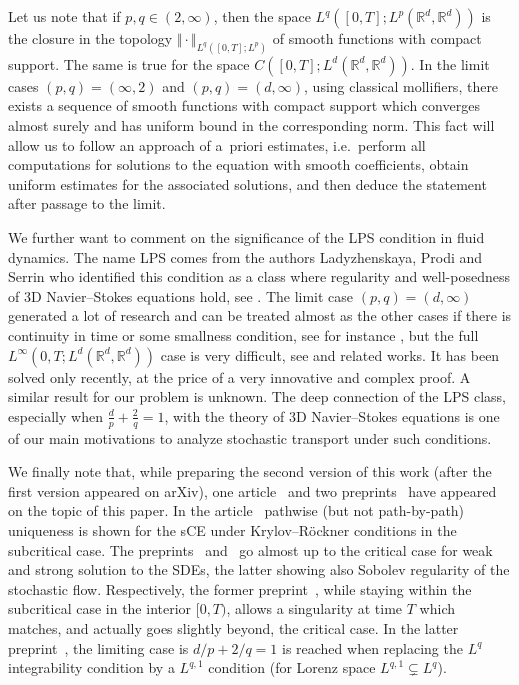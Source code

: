 \documentclass[a4paper,10pt]{article}
\newcommand\1{\mathbbm{1}}
\numberwithin{equation}{section}
\begin{document}
Let us note that if $p,q\in(2,\infty)$, then the space $L^{q}([0,T];L^{p}(\mathbb{R}^{d}, \mathbb{R}^{d}))$ is the closure in the topology $\Vert \cdot\Vert_{L^{q}([0,T];L^{p})}$ of smooth functions with compact support. The same is true for the space $C([ 0,T] ;L^{d}(\mathbb{R}^{d},\mathbb{R}^{d}))$. In the limit cases $(p,q) =(\infty,2)$ and $( p,q)=(d,\infty)$, using classical mollifiers, there exists a sequence of smooth functions with compact support which converges almost surely and has uniform bound in the corresponding norm. This fact will allow us to follow an approach of a~priori estimates, i.e.~perform all computations for solutions to the equation with smooth coefficients, obtain uniform estimates for the associated solutions, and then deduce the statement after passage to the limit.

We further want to comment on the significance of the LPS condition in fluid dynamics. The name LPS comes from the authors Ladyzhenskaya, Prodi and Serrin who identified this condition as a class where regularity and well-posedness of 3D Navier--Stokes equations hold, see \cite{KISLAD57,LIOPRO59,PRODI59,SERRIN62,LADYZ67,GALDI00}. The limit case $( p,q) =(d,\infty)$ generated a lot of research and can be treated almost as the other cases if there is continuity in time or some smallness condition, see for instance \cite{BEIRAO97,LIONS96}, but the full $L^{\infty }( 0,T;L^{d}(\mathbb{R}^{d},\mathbb{R}^{d}))$ case is very difficult, see 
\cite{ESCSERSVE03} and related works. It has been solved only recently, at the price of a very innovative and complex proof. A similar result for our problem is unknown. The deep connection of the LPS class, especially when $\frac{d}{p}+ \frac{2}{q}=1$, with the theory of 3D Navier--Stokes equations is one of our main motivations to analyze stochastic transport under such conditions.

We finally note that, while preparing the second version of this work (after the first version appeared on arXiv), one article~\cite{NEVOLI16} and two preprints~\cite{WLW17,NAM18} have appeared on the topic of this paper. In the article~\cite{NEVOLI16} pathwise (but not path-by-path) uniqueness is shown for the sCE under Krylov--R\"ockner conditions in the subcritical case. The preprints~\cite{WLW17} and~\cite{NAM18} go almost up to the critical case for weak and strong solution to the SDEs, the latter showing also Sobolev regularity of the stochastic flow. Respectively, the former preprint~\cite{WLW17}, while staying within the subcritical case in the interior $[0,T)$, allows a singularity at time $T$ which matches, and actually goes slightly beyond, the critical case. In the latter preprint~\cite{NAM18}, the limiting case is $d/p + 2/q =1$ is reached when replacing the $L^q$ integrability condition by a $L^{q,1}$ condition (for Lorenz space $L^{q,1} \subsetneq L^q$).
\end{document}

